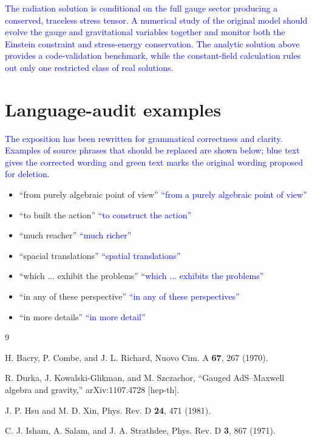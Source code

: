\documentclass[prd,reprint,eqsecnum,nofootinbib]{revtex4-1}
\newcommand{\lang}[1]{\textcolor{blue}{#1}}
\newcommand{\cut}[1]{\textcolor{green!45!black}{#1}}
\begin{document}
\lang{The radiation solution is conditional on the full gauge sector producing a conserved, traceless stress tensor. A numerical study of the original model should evolve the gauge and gravitational variables together and monitor both the Einstein constraint and stress-energy conservation. The analytic solution above provides a code-validation benchmark, while the constant-field calculation rules out only one restricted class of real solutions.}

\section*{Language-audit examples}

\lang{The exposition has been rewritten for grammatical correctness and clarity. Examples of source phrases that should be replaced are shown below; blue text gives the corrected wording and green text marks the original wording proposed for deletion.}
\begin{itemize}
  \item \cut{``from purely algebraic point of view''}
        \quad\lang{``from a purely algebraic point of view''}
  \item \cut{``to built the action''}
        \quad\lang{``to construct the action''}
  \item \cut{``much reacher''}
        \quad\lang{``much richer''}
  \item \cut{``spacial translations''}
        \quad\lang{``spatial translations''}
  \item \cut{``which ... exhibit the problems''}
        \quad\lang{``which ... exhibits the problems''}
  \item \cut{``in any of these perspective''}
        \quad\lang{``in any of these perspectives''}
  \item \cut{``in more details''}
        \quad\lang{``in more detail''}
\end{itemize}

\begin{thebibliography}{9}

H. Bacry, P. Combe, and J. L. Richard,
Nuovo Cim. A \textbf{67}, 267 (1970).

R. Durka, J. Kowalski-Glikman, and M. Szczachor,
``Gauged AdS--Maxwell algebra and gravity,''
arXiv:1107.4728 [hep-th].

J. P. Hsu and M. D. Xin,
Phys. Rev. D \textbf{24}, 471 (1981).

C. J. Isham, A. Salam, and J. A. Strathdee,
Phys. Rev. D \textbf{3}, 867 (1971).

\end{thebibliography}
\end{document}
